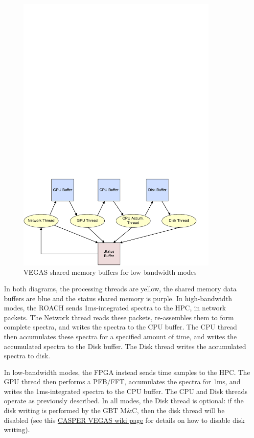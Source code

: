 \documentclass[11pt]{article} %
\begin{document}
\begin{figure}[!h]
\centering
\includegraphics*[width=10cm, viewport = 0 0 560 280]{figures/vegas-buffers-gpu.pdf}
\caption{VEGAS shared memory buffers for low-bandwidth modes}
\label{vegas-buffers-gpu}
\end{figure}

In both diagrams, the processing threads are yellow, the shared memory data buffers are blue and the status shared memory is purple. In high-bandwidth modes, the ROACH sends 1ms-integrated spectra to the HPC, in network packets. The Network thread reads these packets, re-assembles them to form complete spectra, and writes the spectra to the CPU buffer. The CPU thread then accumulates these spectra for a specified amount of time, and writes the accumulated spectra to the Disk buffer. The Disk thread writes the accumulated spectra to disk.

In low-bandwidth modes, the FPGA instead sends time samples to the HPC. The GPU thread then performs a PFB/FFT, accumulates the spectra for 1ms, and writes the 1ms-integrated spectra to the CPU buffer. The CPU and Disk threads operate as previously described. In all modes, the Disk thread is optional: if the disk writing is performed by the GBT M\&C, then the disk thread will be disabled (see this \href{https://casper.berkeley.edu/wiki/GBT_guppi_installattion#Advanced_Installation_Instructions}{CASPER VEGAS wiki page} for details on how to disable disk writing).
\end{document}

